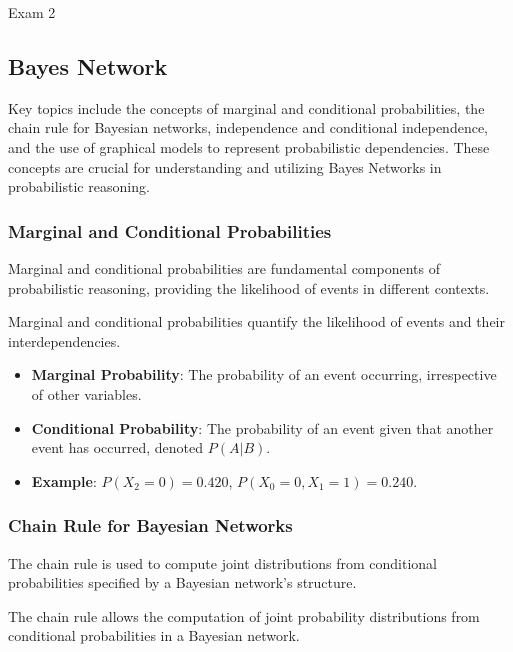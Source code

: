 \begin{examnotes}{Exam 2}
    \subsection*{Bayes Network}

    Key topics include the concepts of marginal and conditional probabilities, the chain rule for Bayesian networks, independence and conditional independence, and the use of graphical models to 
    represent probabilistic dependencies. These concepts are crucial for understanding and utilizing Bayes Networks in probabilistic reasoning.
    
    \subsubsection*{Marginal and Conditional Probabilities}
    
    Marginal and conditional probabilities are fundamental components of probabilistic reasoning, providing the likelihood of events in different contexts.
    
    \begin{highlight}
        Marginal and conditional probabilities quantify the likelihood of events and their interdependencies.
        
        \begin{itemize}
            \item \textbf{Marginal Probability}: The probability of an event occurring, irrespective of other variables.
            \item \textbf{Conditional Probability}: The probability of an event given that another event has occurred, denoted $P(A | B)$.
            \item \textbf{Example}: $P(X_2 = 0) = 0.420$, $P(X_0 = 0, X_1 = 1) = 0.240$.
        \end{itemize}
    \end{highlight}
    
    \subsubsection*{Chain Rule for Bayesian Networks}
    
    The chain rule is used to compute joint distributions from conditional probabilities specified by a Bayesian network's structure.
    
    \begin{highlight}
        The chain rule allows the computation of joint probability distributions from conditional probabilities in a Bayesian network.
        

\end{highlight}
\end{examnotes}
